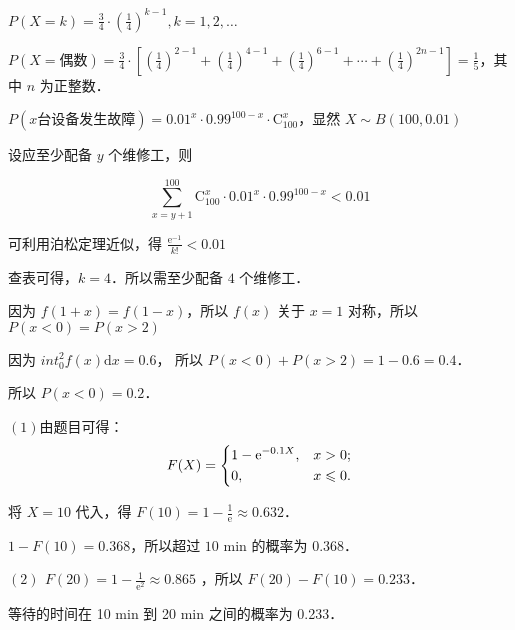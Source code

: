 \documentclass[a4paper]{ctexart}
\edef\sum{\sum\limits}
\begin{document}
 
$\displaystyle P(X=k)=\frac{3}{4}\cdot\left(\frac{1}{4}\right)^{k-1}\!\!,k=1,2,\dots$\par
\smallskip
\makebox[1em][l]{} $\displaystyle P(X=\text{偶数})=\frac{3}{4}\cdot\left[\left(\frac{1}{4}\right)
^{2-1}\!\!\!\!+ \left(\frac{1}{4}\right)^{4-1}\!\!\!\!+ \left(\frac{1}{4}\right)^{6-1}\!\!\!\!
+ \cdots +\left(\frac{1}{4}\right)^{2n-1}\right]=\frac{1}{5}$，其中 $n$ 为正整数．

 $\displaystyle P(x\text{台设备发生故障})=0.01^x \cdot 0.99^{100-x}\cdot
\text{C}_{100}^x$，显然 $X\sim B(100,0.01)$ \par
\phantom{1}\makebox[1em][l]{} 设应至少配备 $y$ 个维修工，则 \par
\[
    \sum_{x = y + 1}^{100}\text{C}_{100}^x \cdot 0.01^x \cdot 0.99^{100-x} < 0.01
\]

\phantom{1}\makebox[1em][l]{} 可利用泊松定理近似，得 $\displaystyle \frac{\mathrm{e}^{-1}}{k!}
<0.01$\par
\smallskip
\phantom{1}\makebox[1em][l]{} 查表可得，$k=4$．所以需至少配备 $4$ 个维修工．

 因为 $f(1+x) = f(1-x)$，所以 $f(x)$ 关于 $x=1$ 对称，所以 $P(x<0) =
P(x>2)$ \par
\smallskip
\phantom{1}\makebox[1em][l]{} 因为 $\displaystyle int_{0}^{2} f(x) \mathrm{d}x = 0.6$，
所以 $P(x<0)+P(x>2)=1-0.6=0.4$．\par
\smallskip
\phantom{1}\makebox[1em][l]{} 所以 $P(x<0)=0.2$．

 $(1) $由题目可得：
\[
    F(X) = \begin{dcases}
        1-\mathrm{e}^{-0.1X}, & x > 0; \\
        0, & x \leqslant  0.
    \end{dcases}
\]

\phantom{2(1) }\makebox[1em][l]{} 将 $X=10$ 代入，得 $\displaystyle F(10)=1-\frac{1}
{\mathrm{e}}\approx 0.632$．\par\smallskip
\phantom{2(1) }\makebox[1em][l]{} $1-F(10)=0.368$，所以超过 $10$ min 的概率为 $0.368$．

\medskip
\phantom{2}\makebox[1em][l]{} $(2) \,\ \displaystyle F(20)=1-\frac{1}{\mathrm{e}^2}\approx
0.865$ ，所以 $F(20)-F(10)=0.233$．\par\smallskip
\phantom{2(2) }\makebox[1em][l]{} 等待的时间在 10 min 到 20 min 之间的概率为 0.233．
\end{document}
